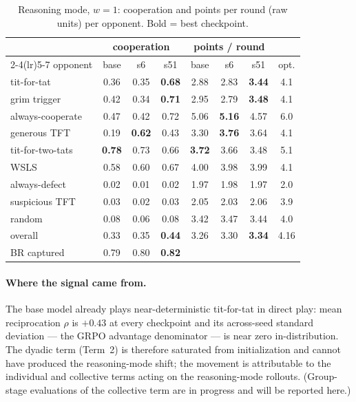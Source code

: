 \documentclass{article}
\begin{document}
\begin{table}[h]
\centering\small
\caption{Reasoning mode, $w=1$: cooperation and points per round (raw units)
per opponent. Bold = best checkpoint.}
\label{tab:think}
\begin{tabular}{l ccc ccc c}
\toprule
& \multicolumn{3}{c}{cooperation} & \multicolumn{3}{c}{points / round} & \\
\cmidrule(lr){2-4}\cmidrule(lr){5-7}
opponent & base & s6 & s51 & base & s6 & s51 & opt. \\
\midrule
tit-for-tat      & 0.36 & 0.35 & \textbf{0.68} & 2.88 & 2.83 & \textbf{3.44} & 4.1 \\
grim trigger     & 0.42 & 0.34 & \textbf{0.71} & 2.95 & 2.79 & \textbf{3.48} & 4.1 \\
always-cooperate & 0.47 & 0.42 & 0.72 & 5.06 & \textbf{5.16} & 4.57 & 6.0 \\
generous TFT     & 0.19 & \textbf{0.62} & 0.43 & 3.30 & \textbf{3.76} & 3.64 & 4.1 \\
tit-for-two-tats & \textbf{0.78} & 0.73 & 0.66 & \textbf{3.72} & 3.66 & 3.48 & 5.1 \\
WSLS             & 0.58 & 0.60 & 0.67 & 4.00 & 3.98 & 3.99 & 4.1 \\
always-defect    & 0.02 & 0.01 & 0.02 & 1.97 & 1.98 & 1.97 & 2.0 \\
suspicious TFT   & 0.03 & 0.02 & 0.03 & 2.05 & 2.03 & 2.06 & 3.9 \\
random           & 0.08 & 0.06 & 0.08 & 3.42 & 3.47 & 3.44 & 4.0 \\
\midrule
overall          & 0.33 & 0.35 & \textbf{0.44} & 3.26 & 3.30 & \textbf{3.34} & 4.16 \\
BR captured      & 0.79 & 0.80 & \textbf{0.82} & & & & \\
\bottomrule
\end{tabular}
\end{table}

\paragraph{Where the signal came from.}
The base model already plays near-deterministic tit-for-tat in direct play:
mean reciprocation $\rho$ is $+0.43$ at every checkpoint and its across-seed
standard deviation --- the GRPO advantage denominator --- is near zero
in-distribution. The dyadic term (Term~2) is therefore saturated from
initialization and cannot have produced the reasoning-mode shift; the
movement is attributable to the individual and collective terms acting on the
reasoning-mode rollouts. (Group-stage evaluations of the collective term are
in progress and will be reported here.)
\end{document}
